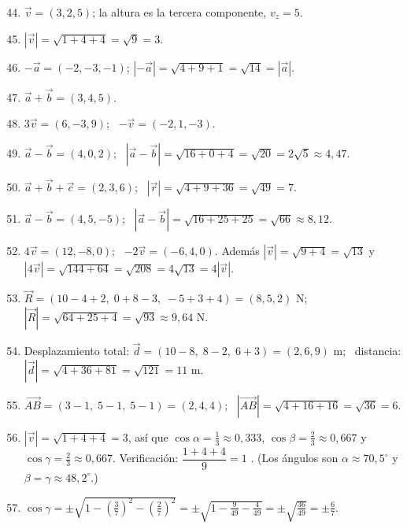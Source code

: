 \documentclass[12pt, letterpaper]{article}
\begin{document}
  \begin{enumerate}[leftmargin=*, label=\textbf{\arabic*.}]
    \setcounter{enumi}{43}
    \item $\vec{v} = (3, 2, 5)$; la altura es la tercera componente, $v_z = 5$.
    \item $|\vec{v}| = \sqrt{1 + 4 + 4} = \sqrt{9} = 3$.
    \item $-\vec{a} = (-2, -3, -1)$; $|-\vec{a}| = \sqrt{4 + 9 + 1} = \sqrt{14} = |\vec{a}|$. \checkmark
    \item $\vec{a} + \vec{b} = (3, 4, 5)$.
    \item $3\vec{v} = (6, -3, 9)$; \ $-\vec{v} = (-2, 1, -3)$.
    \item $\vec{a} - \vec{b} = (4, 0, 2)$; \ $|\vec{a} - \vec{b}| = \sqrt{16 + 0 + 4} = \sqrt{20} = 2\sqrt{5} \approx 4{,}47$.
    \item $\vec{a} + \vec{b} + \vec{c} = (2, 3, 6)$; \ $|\vec{r}| = \sqrt{4 + 9 + 36} = \sqrt{49} = 7$.
    \item $\vec{a} - \vec{b} = (4, 5, -5)$; \ $|\vec{a} - \vec{b}| = \sqrt{16 + 25 + 25} = \sqrt{66} \approx 8{,}12$.
    \item $4\vec{v} = (12, -8, 0)$; \ $-2\vec{v} = (-6, 4, 0)$. Además $|\vec{v}| = \sqrt{9 + 4} = \sqrt{13}$ y $|4\vec{v}| = \sqrt{144 + 64} = \sqrt{208} = 4\sqrt{13} = 4|\vec{v}|$. \checkmark
    \item $\vec{R} = (10 - 4 + 2,\; 0 + 8 - 3,\; -5 + 3 + 4) = (8, 5, 2)$ N; \ $|\vec{R}| = \sqrt{64 + 25 + 4} = \sqrt{93} \approx 9{,}64$ N.
    \item Desplazamiento total: $\vec{d} = (10 - 8,\; 8 - 2,\; 6 + 3) = (2, 6, 9)$ m; \ distancia: $|\vec{d}| = \sqrt{4 + 36 + 81} = \sqrt{121} = 11$ m.
    \item $\overrightarrow{AB} = (3 - 1,\; 5 - 1,\; 5 - 1) = (2, 4, 4)$; \ $|\overrightarrow{AB}| = \sqrt{4 + 16 + 16} = \sqrt{36} = 6$.
    \item $|\vec{v}| = \sqrt{1 + 4 + 4} = 3$, así que $\cos\alpha = \tfrac{1}{3} \approx 0{,}333$, $\cos\beta = \tfrac{2}{3} \approx 0{,}667$ y $\cos\gamma = \tfrac{2}{3} \approx 0{,}667$. Verificación: $\dfrac{1 + 4 + 4}{9} = 1$ \checkmark. (Los ángulos son $\alpha \approx 70{,}5^{\circ}$ y $\beta = \gamma \approx 48{,}2^{\circ}$.)
    \item $\cos\gamma = \pm\sqrt{1 - \left(\tfrac{3}{7}\right)^2 - \left(\tfrac{2}{7}\right)^2} = \pm\sqrt{1 - \tfrac{9}{49} - \tfrac{4}{49}} = \pm\sqrt{\tfrac{36}{49}} = \pm\tfrac{6}{7}$.


\end{enumerate}
\end{document}
